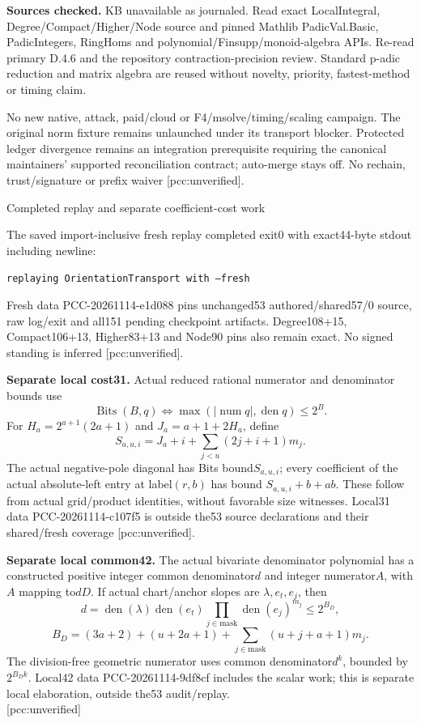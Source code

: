 \documentclass[10pt]{article}
\begin{document}
\textbf{Sources checked.} KB unavailable as journaled. Read exact LocalIntegral,
Degree/Compact/Higher/Node source and pinned Mathlib PadicVal.Basic,
PadicIntegers, RingHoms and polynomial/Finsupp/monoid-algebra APIs. Re-read
primary D.4.6 and the repository contraction-precision review. Standard
p-adic reduction and matrix algebra are reused without novelty, priority,
fastest-method or timing claim.

No new native, attack, paid/cloud or F4/msolve/timing/scaling campaign.
The original norm fixture remains unlaunched under its transport blocker.
Protected ledger divergence remains an integration prerequisite requiring
the canonical maintainers' supported reconciliation contract; auto-merge
stays off. No rechain, trust/signature or prefix waiver [pcc:unverified].
\newpage
\begin{center}{\Large Completed replay and separate coefficient-cost work}\end{center}
The saved import-inclusive fresh replay completed exit0 with exact44-byte
stdout including newline:
\begin{center}\texttt{replaying OrientationTransport with --fresh}\end{center}
Fresh data PCC-20261114-e1d088 pins unchanged53 authored/shared57/0 source,
raw log/exit and all151 pending checkpoint artifacts. Degree108+15,
Compact106+13, Higher83+13 and Node90 pins also remain exact. No signed
standing is inferred [pcc:unverified].
\begin{center}\small
{}
\end{center}

\textbf{Separate local cost31.} Actual reduced rational numerator and
denominator bounds use
\[\operatorname{Bits}(B,q)\iff\max(|\operatorname{num}q|,\operatorname{den}q)\le2^B.\]
For $H_a=2^{a+1}(2a+1)$ and $J_a=a+1+2H_a$, define
\[
 S_{a,u,i}=J_a+i+\sum_{j<u}(2j+i+1)m_j.
\]
The actual negative-pole diagonal has Bits bound$S_{a,u,i}$; every coefficient
of the actual absolute-left entry at label$(r,b)$ has bound
$S_{a,u,i}+b+ab$. These follow from actual grid/product identities, without
favorable size witnesses. Local31 data PCC-20261114-c107f5 is outside the53
source declarations and their shared/fresh coverage [pcc:unverified].

\textbf{Separate local common42.} The actual bivariate denominator polynomial
has a constructed positive integer common denominator$d$ and integer
numerator$A$, with$A$ mapping to$dD$. If actual chart/anchor slopes are
$\lambda,e_t,e_j$, then
\[
 d=\operatorname{den}(\lambda)\operatorname{den}(e_t)
      \prod_{j\in\mathrm{mask}}\operatorname{den}(e_j)^{m_j}
 \le2^{B_D},
\]
\[
 B_D=(3a+2)+(u+2a+1)+\sum_{j\in\mathrm{mask}}(u+j+a+1)m_j.
\]
The division-free geometric numerator uses common denominator$d^k$, bounded
by$2^{B_Dk}$. Local42 data PCC-20261114-9df8cf includes the scalar work;
this is separate local elaboration, outside the53 audit/replay.\\{}
[pcc:unverified]
\end{document}
